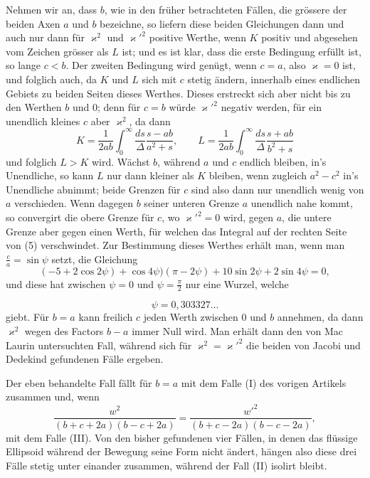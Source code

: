 \documentclass[12pt,a4paper]{book}
\theoremstyle{definition}
\theoremstyle{remark}
\begin{document}
Nehmen wir an, dass $b$, wie in den fr\"uher betrachteten F\"allen, die gr\"ossere der beiden Axen $a$ und $b$ bezeichne, so liefern diese beiden Gleichungen dann und auch nur dann f\"ur $\varkappa^{2}$ und $\varkappa'^{2}$ positive Werthe, wenn $K$ positiv und abgesehen vom Zeichen gr\"osser als $L$ ist; und es ist klar, dass die erste Bedingung erf\"ullt ist, so lange $c < b$. Der zweiten Bedingung wird gen\"ugt, wenn $c = a$, also $\varkappa = 0$ ist, und folglich auch, da $K$ und $L$ sich mit $c$ stetig \"andern, innerhalb eines endlichen Gebiets zu beiden Seiten dieses Werthes. Dieses erstreckt sich aber nicht bis zu den Werthen $b$ und $0$; denn f\"ur $c = b$ w\"urde $\varkappa'^{2}$ negativ werden, f\"ur ein unendlich kleines $c$ aber $\varkappa^{2}$, da dann
\[
K = \frac{1}{2ab}\int_{0}^{\infty}\frac{ds}{\Delta}\frac{s - ab}{a^{2} + s},\qquad L = \frac{1}{2ab}\int_{0}^{\infty}\frac{ds}{\Delta}\frac{s + ab}{b^{2} + s}
\]
und folglich $L > K$ wird. W\"achst $b$, w\"ahrend $a$ und $c$ endlich bleiben, in's Unendliche, so kann $L$ nur dann kleiner als $K$ bleiben, wenn zugleich $a^{2} - c^{2}$ in's Unendliche abnimmt; beide Grenzen f\"ur $c$ sind also dann nur unendlich wenig von $a$ verschieden. Wenn dagegen $b$ seiner unteren Grenze $a$ unendlich nahe kommt, so convergirt die obere Grenze f\"ur $c$, wo $\varkappa'^{2} = 0$ wird, gegen $a$, die untere Grenze aber gegen einen Werth, f\"ur welchen das Integral auf der rechten Seite von (5) verschwindet. Zur Bestimmung dieses Werthes erh\"alt man, wenn man $\frac{c}{a} = \sin\psi$ setzt, die Gleichung
\[
(-5 + 2\cos 2\psi) + \cos 4\psi)(\pi - 2\psi) + 10\sin 2\psi + 2\sin 4\psi = 0,
\]
und diese hat zwischen $\psi = 0$ und $\psi = \frac{\pi}{2}$ nur eine Wurzel, welche

\[
\psi = 0{,}303327\ldots
\]
giebt. F\"ur $b = a$ kann freilich $c$ jeden Werth zwischen $0$ und $b$ annehmen, da dann $\varkappa^{2}$ wegen des Factors $b - a$ immer Null wird. Man erh\"alt dann den von Mac Laurin untersuchten Fall, w\"ahrend sich f\"ur $\varkappa^{2} = \varkappa'^{2}$ die beiden von Jacobi und Dedekind gefundenen F\"alle ergeben.

Der eben behandelte Fall f\"allt f\"ur $b = a$ mit dem Falle (I) des vorigen Artikels zusammen und, wenn
\[
\frac{w^{2}}{(b+c+2a)(b-c+2a)} = \frac{w'^{2}}{(b+c-2a)(b-c-2a)},
\]
mit dem Falle (III). Von den bisher gefundenen vier F\"allen, in denen das fl\"ussige Ellipsoid w\"ahrend der Bewegung seine Form nicht \"andert, h\"angen also diese drei F\"alle stetig unter einander zusammen, w\"ahrend der Fall (II) isolirt bleibt.
\end{document}
